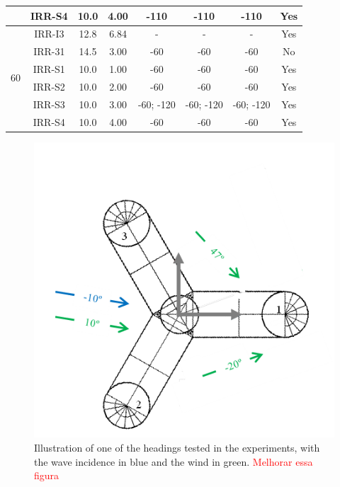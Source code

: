\begin{table}[htbp]
\begin{tabular}{cccccccc}
		& IRR-S4 & 10.0  & 4.00  & -110  & -110  & -110 & Yes\\
		\midrule
		\multirow{6}[2]{*}{60\textdegree{}} & IRR-I3 & 12.8  & 6.84 & -     & -     & - & Yes\\
		& IRR-31 & 14.5  & 3.00  & -60\textdegree{}   & -60\textdegree{}   & -60\textdegree{} & No\\
		& IRR-S1 & 10.0  & 1.00  & -60\textdegree{}   & -60\textdegree{}   & -60\textdegree{} & Yes\\
		& IRR-S2 & 10.0  & 2.00  & -60\textdegree{}   & -60\textdegree{}   & -60\textdegree{} & Yes\\
		& IRR-S3 & 10.0  & 3.00  & -60\textdegree{}; -120\textdegree{} & -60\textdegree{}; -120\textdegree{} & -60\textdegree{}; -120\textdegree{} & Yes\\
		& IRR-S4 & 10.0  & 4.00  & -60\textdegree{}   & -60\textdegree{}   & -60\textdegree{} & Yes\\
		\bottomrule
	\end{tabular}%
	\label{tab:addlabel}%
\end{table}%



\begin{figure}[!hbtp]
	\centering
	\includegraphics[trim={0 0 0 1.5cm},clip, width=0.4\columnwidth]{./figures/APR01.png}
	\caption{Illustration of one of the headings tested in the experiments, with the wave incidence in blue and the wind in green. \textcolor{red}{Melhorar essa figura}} \label{fig:description_experiment:APR01}%
\end{figure}%




